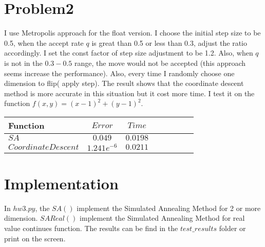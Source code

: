 \documentclass[11pt]{article}
\begin{document}
\section{Problem2}
I use Metropolis approach for the float version. I choose the initial step size to be 0.5, when the accept rate  $q$ is great than 0.5 or less than 0.3, adjust the ratio accordingly. I set the const factor of step size adjustment to be 1.2. Also, when $q$ is not in the $0.3-0.5$ range, the move would not be accepted (this approach seems increase the performance). Also, every time I randomly choose one dimension to flip( apply step). The result shows that the coordinate descent method is more accurate in this situation but it cost more time. I test it on the function $f(x,y) = (x-1)^2 + (y-1)^2$.
\begin{center} 
\begin{tabular}{l*{6}{c}r} Function &  $Error$ & $Time$
 \\ \hline $SA$ &  $0.049$ & $0.0198$
\\ $Coordinate Descent$ & $1.241e^{-6}$ & $0.0211$ 
\\ \end{tabular}
 \end{center}
\section{Implementation}
In $hw3.py$,  the $SA()$ implement the Simulated Annealing Method for 2 or more dimension. $SAReal()$ implement the Simulated Annealing Method for real value continues function. The results can be find in the $test\_results$ folder or print on the screen.
\end{document}
